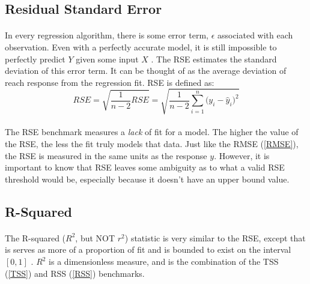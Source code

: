 \documentclass[12pt,letterpaper]{article}
\begin{document}

\subsection{Residual Standard Error}
\paragraph*{}In every regression algorithm, there is some error term, $\epsilon$ associated with each observation. Even with a perfectly accurate model, it is still impossible to perfectly predict $Y$ given some input $X$ \cite{James}. The RSE estimates the standard deviation of this error term.  It can be thought of as the average deviation of reach response from the regression fit. RSE is defined as:
\begin{equation}
RSE = \sqrt{\frac{1}{n-2}RSE} = 
\sqrt{\frac{1}{n-2}\sum_{i=1}^n \big(y_i - \hat{y}_i \big)^2}
\end{equation}
\paragraph*{}The RSE benchmark measures a \textit{lack} of fit for a model. The higher the value of the RSE, the less the fit truly models that data. Just like the RMSE (\ref{RMSE}), the RSE is measured in the same units as the response 
$y$. However, it is important to know that RSE leaves some ambiguity as to what a valid RSE threshold would be, especially because it  doesn't have an  upper bound value.



\subsection{R-Squared}
\paragraph*{}The R-squared ($R^2$, but NOT $r^2$) statistic is very similar to the RSE, except that is serves as more of a proportion of fit and is bounded to exist on the interval $[0,1]$ \cite{James}. $R^2$ is a dimensionless measure, and is the combination of the TSS (\ref{TSS}) and RSS (\ref{RSS}) benchmarks. 


\end{document}
